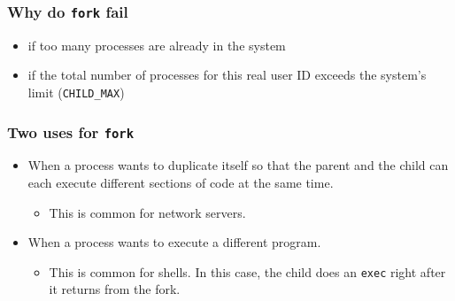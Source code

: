 \documentclass[newPxFont,sthlmFooter,nooffset]{beamer}
\begin{document}

\begin{frame}[t]
  \frametitle{Why do \texttt{fork} fail}
  \begin{itemize}
  \item if too many processes are already in the system
  \item if the total number of processes for this real user ID exceeds the system's limit (\texttt{CHILD\_MAX})
  \end{itemize}
\end{frame}


\begin{frame}[t]
  \frametitle{Two uses for \texttt{fork}}
  \begin{itemize}
  \item  When a process wants to duplicate itself so that the parent and the child can each execute different sections of code at the same time.
    \begin{itemize}
    \item This is common for network servers.
    \end{itemize}
  \item When a process wants to execute a different program.
    \begin{itemize}
    \item This is common for shells. In this case, the child does an
      \texttt{exec} right after it returns from the fork.
    \end{itemize}

  \end{itemize}
\end{frame}
\end{document}
